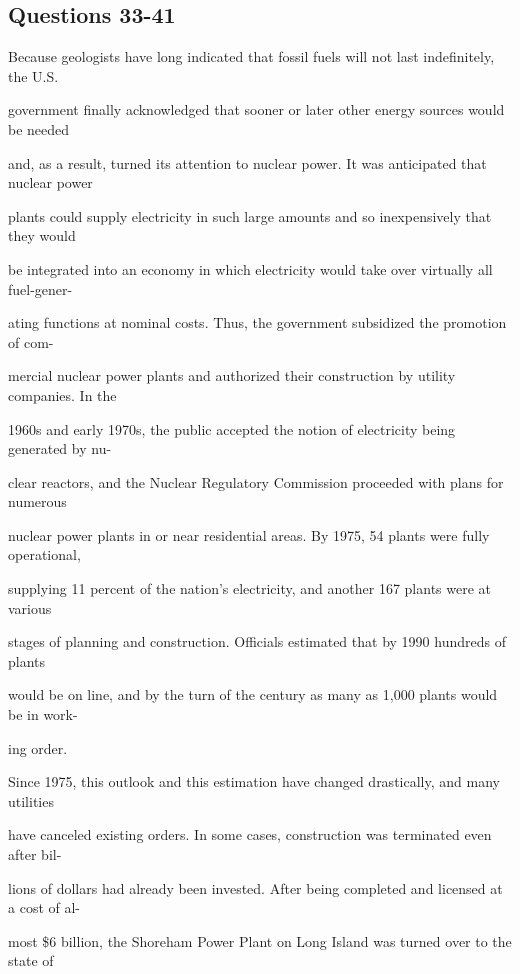\documentclass[12pt]{article}
\begin{document}
\subsection*{Questions 33-41}
\begingroup
\small
\sloppy
\setlength{\parskip}{0pt}
\setlength{\parindent}{0pt}
Because geologists have long indicated that fossil fuels will not last indefinitely, the U.S.\par
government finally acknowledged that sooner or later other energy sources would be needed\par
and, as a result, turned its attention to nuclear power. It was anticipated that nuclear power\par
plants could supply electricity in such large amounts and so inexpensively that they would\par
be integrated into an economy in which electricity would take over virtually all fuel-gener-\par
ating functions at nominal costs. Thus, the government subsidized the promotion of com-\par
mercial nuclear power plants and authorized their construction by utility companies. In the\par
1960s and early 1970s, the public accepted the notion of electricity being generated by nu-\par
clear reactors, and the Nuclear Regulatory Commission proceeded with plans for numerous\par
nuclear power plants in or near residential areas. By 1975, 54 plants were fully operational,\par
supplying 11 percent of the nation's electricity, and another 167 plants were at various\par
stages of planning and construction. Officials estimated that by 1990 hundreds of plants\par
would be on line, and by the turn of the century as many as 1,000 plants would be in work-\par
ing order.\par
Since 1975, this outlook and this estimation have changed drastically, and many utilities\par
have canceled existing orders. In some cases, construction was terminated even after bil-\par
lions of dollars had already been invested. After being completed and licensed at a cost of al-\par
most \$6 billion, the Shoreham Power Plant on Long Island was turned over to the state of\par
\end{document}
